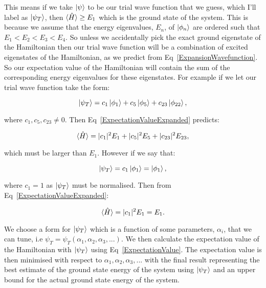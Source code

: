 \noindent This means if we take $\ket{\psi}$ to be our trial wave function that we guess, which I'll label as $\ket{\psi_T}$, then $\braket{\Hat{H}} \geq E_1$ which is the ground state of the system. This is because we assume that the energy eigenvalues, $E_n$, of $\ket{\phi_n}$ are ordered such that $E_1 < E_2 < E_3 < E_4$. So unless we accidentally pick the exact ground eigenstate of the Hamiltonian then our trial wave function will be a combination of excited eigenstates of the Hamiltonian, as we predict from Eq~\ref{ExpansionWavefunction}. So our expectation value of the Hamiltonian will contain the sum of the corresponding energy eigenvalues for these eigenstates. For example if we let our trial wave function take the form:

\begin{equation}
    \ket{\psi_T} = c_1 \ket{\phi_1} + c_5 \ket{\phi_5} + c_{23} \ket{\phi_{22}},
    \label{Example1Wavefunction}
\end{equation}

\noindent where $c_1, c_5, c_{23} \neq 0$. Then Eq~\ref{ExpectationValueExpanded} predicts:

\begin{equation}
    \braket{\Hat{H}} = |c_1|^2 E_1 + |c_5|^2 E_5 + |c_{23}|^2 E_{23},
    \label{Example1Value}
\end{equation}

\noindent which must be larger than $E_1$. However if we say that:

\begin{equation}
    \ket{\psi_T} = c_1 \ket{\phi_1} = \ket{\phi_1},
    \label{Example2Wavefunction}
\end{equation}

\noindent where $c_1 = 1$ as $\ket{\psi_T}$ must be normalised. Then from Eq~\ref{ExpectationValueExpanded}:

\begin{equation}
    \braket{\Hat{H}} = |c_1|^2 E_1 = E_1.
    \label{Example2Value}
\end{equation}

\noindent We choose a form for $\ket{\psi_T}$ which is a function of some parameters, $\alpha_i$, that we can tune, i.e $\psi_T = \psi_T (\alpha_1, \alpha_2, \alpha_3, ...)$. We then calculate the expectation value of the Hamiltonian with $\ket{\psi_T}$ using Eq~\ref{ExpectationValue}. The expectation value is then minimised with respect to $\alpha_1, \alpha_2, \alpha_3, ...$ with the final result representing the best estimate of the ground state energy of the system using $\ket{\psi_T}$ and an upper bound for the actual ground state energy of the system.


